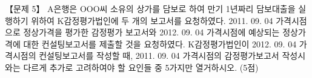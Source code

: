 \begin{longquestion}{【문제 5】}
A은행은 ΟΟΟ씨 소유의 상가를 담보로 하여 만기 1년짜리 담보대출을 실행하기 위하여 K감정평가법인에 두 개의 보고서를 요청하였다. 2011. 09. 04 가격시점으로 정상가격을 평가한 감정평가 보고서와 2012. 09. 04 가격시점에 예상되는 정상가격에 대한 컨설팅보고서를 제출할 것을 요청하였다. K감정평가법인이 2012. 09. 04 가격시점의 컨설팅보고서를 작성할 때, 2011. 09. 04 가격시점의 감정평가보고서 작성시와는 다르게 추가로 고려하여야 할 요인들 중 5가지만 열거하시오. (5점) \par
\end{longquestion}
